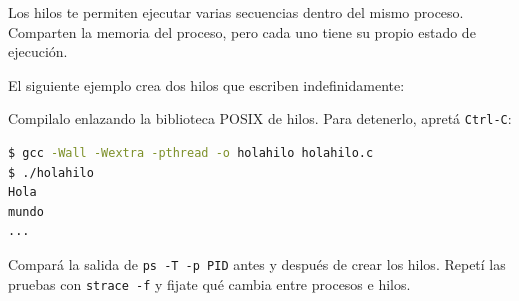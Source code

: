 \documentclass[11pt,a4paper]{article}
\newcommand{\inputcode}[2][]{%
  \par\noindent\begin{minipage}{\linewidth}
    
  \end{minipage}\par}
\begin{document}
Los hilos te permiten ejecutar varias secuencias dentro del mismo proceso. Comparten la memoria del proceso, pero cada uno tiene su propio estado de ejecución.

El siguiente ejemplo crea dos hilos que escriben indefinidamente:

\inputcode[language=C]{../examples/tp2/processes/holahilo.c}

Compilalo enlazando la biblioteca POSIX de hilos. Para detenerlo, apretá \texttt{Ctrl-C}:

\begin{lstlisting}[language=bash]
$ gcc -Wall -Wextra -pthread -o holahilo holahilo.c
$ ./holahilo
Hola
mundo
...
\end{lstlisting}

\begin{extrabox}
Compará la salida de \texttt{ps -T -p PID} antes y después de crear los hilos. Repetí las pruebas con \texttt{strace -f} y fijate qué cambia entre procesos e hilos.
\end{extrabox}
\end{document}
